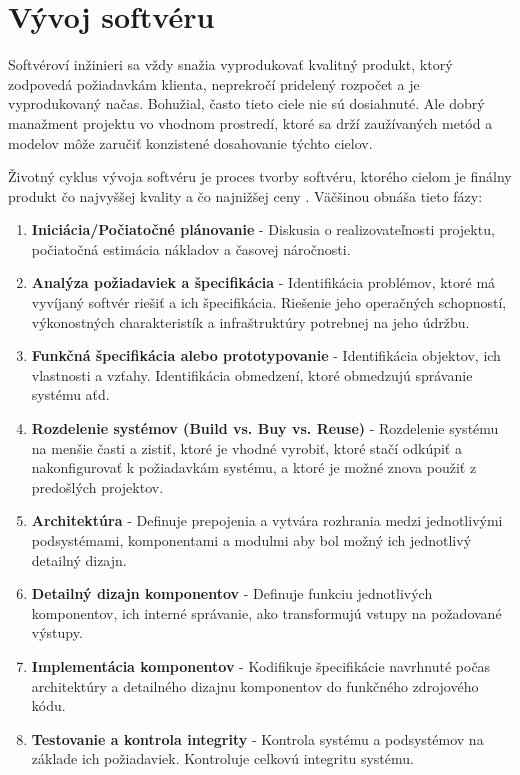 \documentclass[10pt,twoside,slovak,a4paper]{article}
\begin{document}
\section{Vývoj softvéru} \label{vyvojSoftveru}

Softvéroví inžinieri sa vždy snažia vyprodukovať kvalitný produkt, ktorý zodpovedá požiadavkám klienta, neprekročí pridelený rozpočet a je vyprodukovaný načas. Bohužial, často tieto ciele nie sú dosiahnuté. Ale dobrý manažment projektu vo vhodnom prostredí, ktoré sa drží zaužívaných metód a modelov môže zaručiť konzistené dosahovanie týchto cielov. \cite{Methodologies}

Životný cyklus vývoja softvéru je proces tvorby softvéru, ktorého cielom je finálny produkt čo najvyššej kvality a čo najnižšej ceny \cite{SDLCdef}. Väčšinou obnáša tieto fázy:\cite{SDCLphases}
\begin{sloppypar}
\begin{enumerate}
\item \textbf{Iniciácia/Počiatočné plánovanie} - Diskusia o realizovateľnosti projektu, počiatočná estimácia nákladov a časovej náročnosti.
\item \textbf{Analýza požiadaviek a špecifikácia} - Identifikácia problémov, ktoré má vyvíjaný softvér riešiť a ich špecifikácia. Riešenie jeho operačných schopností, výkonostných charakteristík a infraštruktúry potrebnej na jeho údržbu.
\item \textbf{Funkčná špecifikácia alebo prototypovanie} - Identifikácia objektov, ich vlastnosti a vzťahy. Identifikácia obmedzení, ktoré obmedzujú správanie systému aťd. 
\item \textbf{Rozdelenie systémov (Build vs. Buy vs. Reuse)} - Rozdelenie systému na menšie časti a zistiť, ktoré je vhodné vyrobiť, ktoré stačí odkúpiť a nakonfigurovať k požiadavkám systému, a ktoré je možné znova použiť z predošlých projektov.
\item \textbf{Architektúra} - Definuje prepojenia a vytvára rozhrania medzi jednotlivými podsystémami, komponentami a modulmi aby bol možný ich jednotlivý detailný dizajn.
\item \textbf{Detailný dizajn komponentov} - Definuje funkciu jednotlivých komponentov, ich interné správanie, ako transformujú vstupy na požadované výstupy.
\item \textbf{Implementácia komponentov} - Kodifikuje špecifikácie navrhnuté počas architektúry a detailného dizajnu komponentov do funkčného zdrojového kódu.
\item \textbf{Testovanie a kontrola integrity} - Kontrola systému a podsystémov na základe ich požiadaviek. Kontroluje celkovú integritu systému.

\end{enumerate}
\end{sloppypar}
\end{document}
